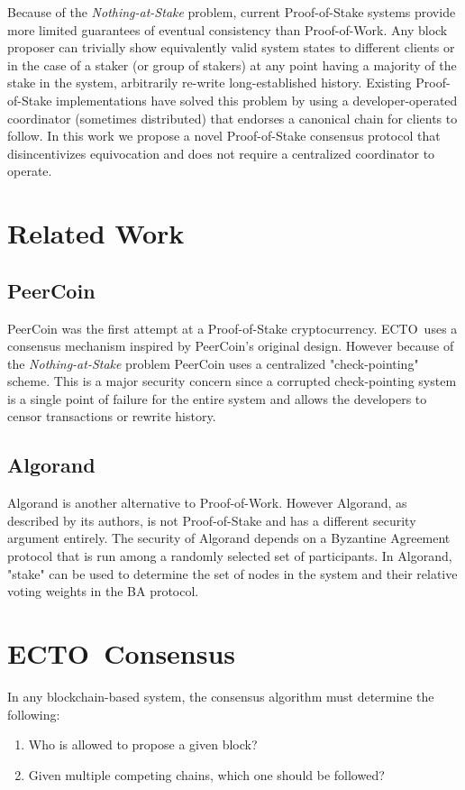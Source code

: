 \documentclass{article}
\newcommand{\coin}{ \textsc{ECTO}\ }
\begin{document}
Because of the \textit{Nothing-at-Stake} problem, current Proof-of-Stake systems provide more limited guarantees of eventual consistency than Proof-of-Work. Any block proposer can trivially show equivalently valid system states to different clients or in the case of a staker (or group of stakers) at any point having a majority of the stake in the system, arbitrarily re-write long-established history. Existing Proof-of-Stake implementations have solved this problem by using a developer-operated coordinator (sometimes distributed) that endorses a canonical chain for clients to follow. In this work we propose a novel Proof-of-Stake consensus protocol that disincentivizes equivocation and does not require a centralized coordinator to operate. 

\section{Related Work}

\subsection{PeerCoin}
PeerCoin \cite{peercoin} was the first attempt at a Proof-of-Stake cryptocurrency. \coin uses a consensus mechanism inspired by PeerCoin's original design. However because of the \textit{Nothing-at-Stake} problem PeerCoin uses a centralized "check-pointing" scheme. This is a major security concern since a corrupted check-pointing system is a single point of failure for the entire system and allows the developers to censor transactions or rewrite history.

\subsection{Algorand}
Algorand \cite{algorand} is another alternative to Proof-of-Work. However Algorand, as described by its authors, is not Proof-of-Stake and has a different security argument entirely. The security of Algorand depends on a Byzantine Agreement protocol that is run among a randomly selected set of participants. In Algorand, "stake" can be used to determine the set of nodes in the system and their relative voting weights in the BA protocol.

\section{\coin Consensus}

In any blockchain-based system, the consensus algorithm must determine the following:
\begin{enumerate}
\item{Who is allowed to propose a given block?}
\item{Given multiple competing chains, which one should be followed?}
\end{enumerate}
\end{document}
